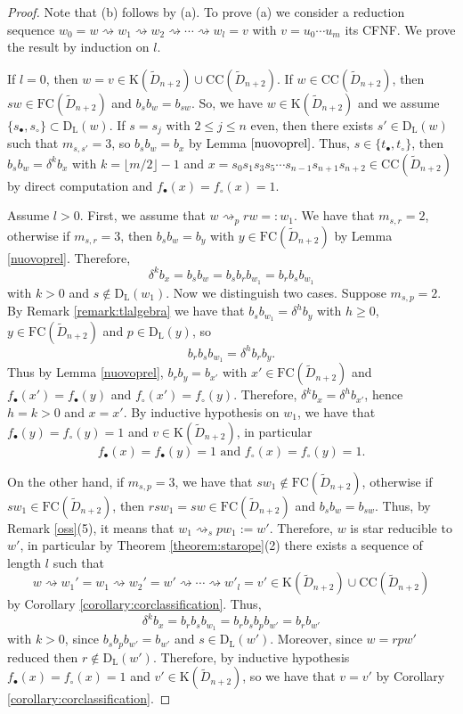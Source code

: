 \documentclass{amsart}
\newcommand{\D}{{\widetilde{D}_{n+2}}}
\newcommand{\ld}{{\mathrm{D}_{\mathrm{L}}}}
\newcommand{\fc}{{\mathrm{FC}}}
\newcommand{\s}{{s_{\bullet}}}
\newcommand{\ti}{{t_{\bullet}}}
\newcommand{\sn}{{s_\circ}}
\newcommand{\tn}{{t_\circ}}
\newcommand{\TTC}{\mathrm{CC}}
\newcommand{\car}{\mathrm{K}}
\newcommand{\red}{\rightsquigarrow}
\theoremstyle{definition}
\begin{document}
\begin{proof}

Note that (b) follows by (a). 
To prove (a) we consider a reduction sequence $w_0=w\red w_1\red w_2\red \cdots \red w_l=v$ with $v=u_0\cdots u_m$ its CFNF.
We prove the result by induction on $l$.

If $l=0$, then $w=v\in \car(\D)\cup \TTC(\D)$. If $w\in \TTC(\D)$, then $sw\in \fc(\D)$ and $b_sb_{w}=b_{sw}$. So, we have $w\in \car(\D)$ and we assume $\{\s , \sn\}\subset \ld(w)$. If $s=s_j$ with $2\le j\le n$ even, then there exists $s'\in \ld(w)$ such that $m_{s,s'}=3$, so $b_sb_w=b_x$ by Lemma $\ref{nuovoprel}$. Thus, $s\in \{\ti, \tn\}$, then $b_sb_w=\delta ^kb_x$ with $k=\lfloor m/2\rfloor -1$ and $x=s_0s_1s_3s_5\cdots s_{n-1}s_{n+1}s_{n+2}\in \TTC(\D)$ by direct computation and $f_\bullet(x)=f_\circ(x)=1$. 

Assume $l>0$. First, we assume that $w\red_p rw=:w_1$. We have that $m_{s,r}=2$, otherwise if $m_{s,r}=3$, then $b_sb_w=b_y$ with $y\in \fc(\D)$ by Lemma \ref{nuovoprel}. Therefore, 
\[\delta ^kb_{x}=b_sb_w=b_sb_{r}b_{w_1}=b_{r}b_{s}b_{w_1}\] with $k>0$ and $s\notin \ld(w_1)$.
Now we distinguish two cases. Suppose $m_{s,p}=2$. By Remark \ref{remark:tlalgebra} we have that $b_sb_{w_1}=\delta ^hb_{y}$ with $h\ge 0$, $y\in \fc(\D)$ and $p\in \ld(y)$, so \[b_rb_{s}b_{w_1}=\delta ^hb_{r}b_{y}.\]
Thus by Lemma \ref{nuovoprel}, $b_rb_y=b_{x'}$ with $x'\in \fc(\D)$ and $f_\bullet(x')=f_\bullet(y)$ and $f_\circ(x')=f_\circ(y)$. Therefore, $\delta ^kb_{x}=\delta ^hb_{x'}$, hence $h=k>0$ and $x=x'$. By inductive hypothesis on $w_1$, we have that $f_\bullet(y)=f_\circ(y)=1$ and $v\in \car(\D)$, in particular \[f_\bullet(x)=f_\bullet(y)=1 \mbox{ and }f_\circ(x)=f_\circ(y)=1.\]

On the other hand, if $m_{s,p}=3$, we have that $sw_1\notin \fc(\D)$, otherwise if $sw_1\in \fc(\D)$, then $rsw_1=sw\in \fc(\D)$ and $b_sb_w=b_{sw}$. 
Thus, by Remark \ref{oss}(5), it means that $w_1\red_s pw_1:=w'$. Therefore, $w$ is star reducible to $w'$, in particular by Theorem \ref{theorem:starope}(2) there exists a sequence of length $l$ such that\[ w\red w_1'=w_1\red w_2'=w'\red \cdots \red w'_l=v'\in \car(\D)\cup \TTC(\D)\] 
by Corollary \ref{corollary:corclassification}. Thus, \[\delta ^kb_x=b_{r}b_{s}b_{w_1}=b_{r}b_{s}b_{p}b_{w'}=b_{r}b_{w'}\] with $k>0$, since $b_{s}b_{p}b_{w'}=b_{w'}$ and $s\in \ld(w')$. Moreover, since $w=rpw'$ reduced then $r\notin \ld(w')$. Therefore, by inductive hypothesis $f_\bullet(x)=f_\circ(x)=1$ and $v'\in \car(\D)$, so we have that $v=v'$ by Corollary \ref{corollary:corclassification}.


\end{proof}
\end{document}
